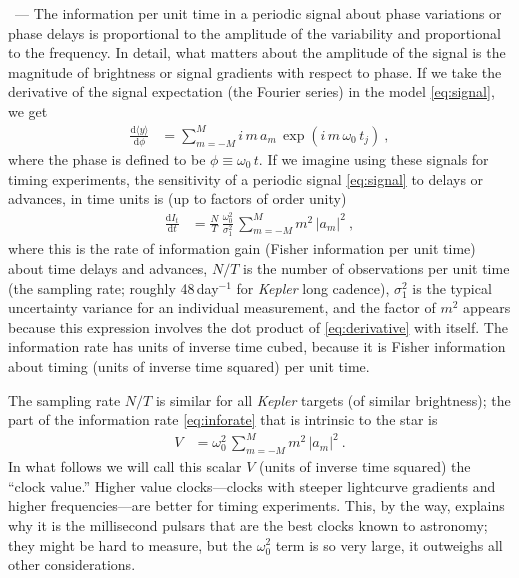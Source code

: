 \documentclass{article}
\renewcommand{\paragraph}[1]{\medskip\par\noindent{\textbf{#1}}~---}
\newcommand{\dd}{\mathrm{d}}
\begin{document}
\paragraph{Information theory}
The information per unit time in a periodic signal about phase variations or phase delays is proportional to the amplitude of the variability and proportional to the frequency.
In detail, what matters about the amplitude of the signal is the magnitude of brightness or signal gradients with respect to phase.
If we take the derivative of the signal expectation (the Fourier series) in the model \eqref{eq:signal}, we get
\begin{align}
    \frac{\dd\langle y\rangle}{\dd\phi} &= \sum_{m=-M}^M i\,m\,a_m\,\exp(i\,m\,\omega_0\,t_j) ~, \label{eq:derivative}
\end{align}
where the phase is defined to be $\phi \equiv \omega_0\,t$.
If we imagine using these signals for timing experiments, the sensitivity of a periodic signal \eqref{eq:signal} to delays or advances, in time units is (up to factors of order unity)
\begin{align}
    \frac{\dd I_t}{\dd t} &= \frac{N}{T}\,\frac{\omega_0^2}{\sigma_1^2}\,\sum_{m=-M}^M m^2\,|a_m|^2 ~, \label{eq:inforate}
\end{align}
where this is the rate of information gain (Fisher information per unit time) about time delays and advances,
$N/T$ is the number of observations per unit time (the sampling rate; roughly 48\,day$^{-1}$ for \textsl{Kepler} long cadence),
$\sigma_1^2$ is the typical uncertainty variance for an individual measurement,
and the factor of $m^2$ appears because this expression involves the dot product of \eqref{eq:derivative} with itself.
The information rate has units of inverse time cubed, because it is Fisher information about timing (units of inverse time squared) per unit time.

The sampling rate $N/T$ is similar for all \textsl{Kepler} targets (of similar brightness); the part of the information rate \eqref{eq:inforate} that is intrinsic to the star is
\begin{align}
    V &= \omega_0^2\,\sum_{m=-M}^M m^2\,|a_m|^2 ~. \label{eq:value}
\end{align}
In what follows we will call this scalar $V$ (units of inverse time squared) the ``clock value.''
Higher value clocks---clocks with steeper lightcurve gradients and higher frequencies---are better for timing experiments.
This, by the way, explains why it is the millisecond pulsars that are the best clocks known to astronomy;
they might be hard to measure, but the $\omega_0^2$ term is so very large, it outweighs all other considerations.
\end{document}

